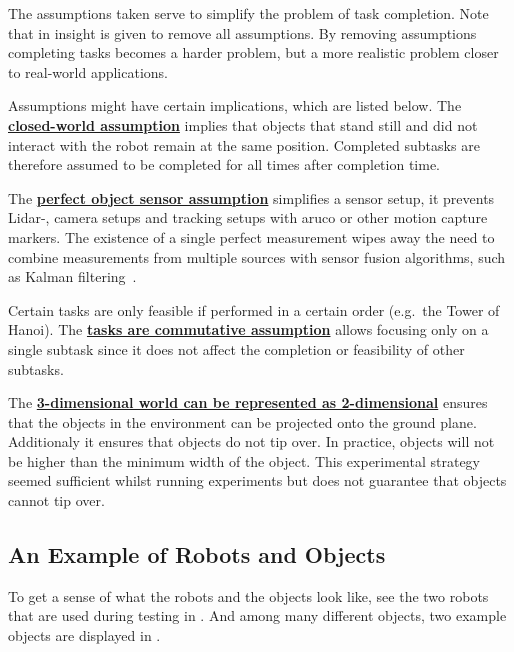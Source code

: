 The assumptions taken serve to simplify the problem of task completion. Note that in  insight is given to remove all assumptions. By removing assumptions completing tasks becomes a harder problem, but a more realistic problem closer to real-world applications.\bs

Assumptions might have certain implications, which are listed below. The \hyperref[assumption:closed_world]{\textbf{closed-world assumption}} implies that objects that stand still and did not interact with the robot remain at the same position. Completed subtasks are therefore assumed to be completed for all times after completion time.\bs

The \hyperref[assumption:perfect_object_sensor]{\textbf{perfect object sensor assumption}} simplifies a sensor setup, it prevents Lidar-, camera setups and tracking setups with aruco or other motion capture markers. The existence of a single perfect measurement wipes away the need to combine measurements from multiple sources with sensor fusion algorithms, such as Kalman filtering~\cite{verhaegen_filtering_2007}.\bs

Certain tasks are only feasible if performed in a certain order (e.g.~the Tower of Hanoi). The \hyperref[assumption:order_does_not_matter]{\textbf{tasks are commutative assumption}} allows focusing only on a single subtask since it does not affect the completion or feasibility of other subtasks.\bs

The \hyperref[assumption:no_tipping]{\textbf{3-dimensional world can be represented as 2-dimensional}} ensures that the objects in the environment can be projected onto the ground plane. Additionaly it ensures that objects do not tip over. In practice, objects will not be higher than the minimum width of the object. This experimental strategy seemed sufficient whilst running experiments but does not guarantee that objects cannot tip over.

\subsection{An Example of Robots and Objects}
To get a sense of what the robots and the objects look like, see the two robots that are used during testing in . And among many different objects, two example objects are displayed in .

